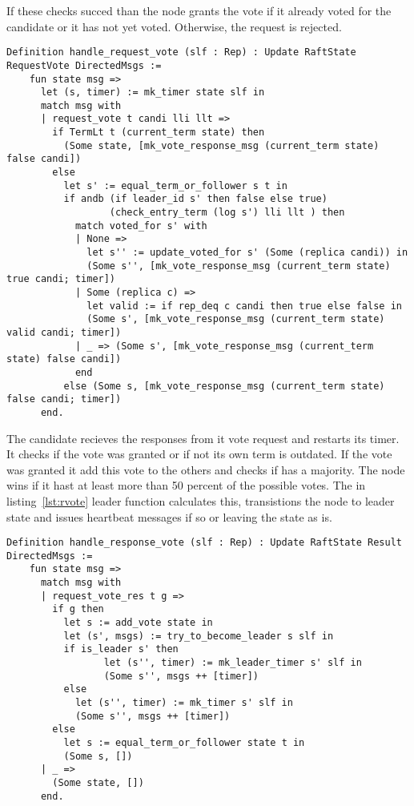 If these checks succed than the node grants the vote if it already voted
for the candidate or it has not yet voted. Otherwise, the request is
rejected.  

\begin{lstlisting}[style=coq,label=lst:vote,
caption=The definitions on how a node changes it node state.]
  Definition handle_request_vote (slf : Rep) : Update RaftState RequestVote DirectedMsgs :=
    fun state msg =>
      let (s, timer) := mk_timer state slf in
      match msg with
      | request_vote t candi lli llt =>
        if TermLt t (current_term state) then
          (Some state, [mk_vote_response_msg (current_term state) false candi])
        else
          let s' := equal_term_or_follower s t in 
          if andb (if leader_id s' then false else true)
                  (check_entry_term (log s') lli llt ) then
            match voted_for s' with
            | None =>
              let s'' := update_voted_for s' (Some (replica candi)) in
              (Some s'', [mk_vote_response_msg (current_term state) true candi; timer])
            | Some (replica c) =>
              let valid := if rep_deq c candi then true else false in
              (Some s', [mk_vote_response_msg (current_term state) valid candi; timer])
            | _ => (Some s', [mk_vote_response_msg (current_term state) false candi])
            end
          else (Some s, [mk_vote_response_msg (current_term state) false candi; timer])
      end.
\end{lstlisting}

The candidate recieves the responses from it vote request and restarts its
timer. It checks if the vote was granted or if not its own term is outdated.
If the vote was granted it add this vote to the others and checks if has a
majority. The node wins if it hast at least more than 50 percent of
the possible votes. The  in listing~\ref{lst:rvote}
leader function calculates this, transistions the node to leader state and
issues heartbeat messages if so or leaving the state as is.

\begin{lstlisting}[style=coq,label=lst:rvote,
caption=The definitions on how a node changes it node state.]
  Definition handle_response_vote (slf : Rep) : Update RaftState Result DirectedMsgs :=
    fun state msg =>
      match msg with
      | request_vote_res t g =>
        if g then 
          let s := add_vote state in
          let (s', msgs) := try_to_become_leader s slf in
          if is_leader s' then
                 let (s'', timer) := mk_leader_timer s' slf in
                 (Some s'', msgs ++ [timer])
          else
            let (s'', timer) := mk_timer s' slf in
            (Some s'', msgs ++ [timer])
        else
          let s := equal_term_or_follower state t in
          (Some s, [])
      | _ => 
        (Some state, [])
      end.
\end{lstlisting}


